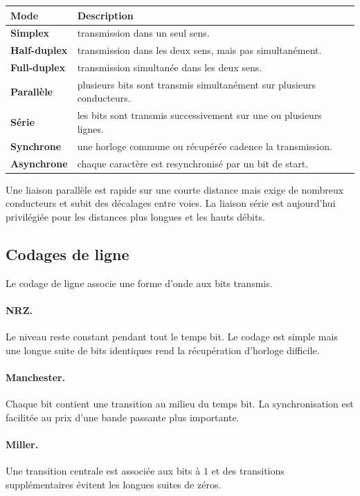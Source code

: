\begin{center}
\small
\begin{tabularx}{\linewidth}{>{\bfseries}p{2.5cm}X}
\toprule
Mode & Description \\
\midrule
Simplex & transmission dans un seul sens.\\
Half-duplex & transmission dans les deux sens, mais pas simultanément.\\
Full-duplex & transmission simultanée dans les deux sens.\\
Parallèle & plusieurs bits sont transmis simultanément sur plusieurs conducteurs.\\
Série & les bits sont transmis successivement sur une ou plusieurs lignes.\\
Synchrone & une horloge commune ou récupérée cadence la transmission.\\
Asynchrone & chaque caractère est resynchronisé par un bit de start.\\
\bottomrule
\end{tabularx}
\end{center}

Une liaison parallèle est rapide sur une courte distance mais exige de nombreux conducteurs et subit des décalages entre voies. La liaison série est aujourd'hui privilégiée pour les distances plus longues et les hauts débits.

\subsection{Codages de ligne}

Le codage de ligne associe une forme d'onde aux bits transmis.

\paragraph{NRZ.}
Le niveau reste constant pendant tout le temps bit. Le codage est simple mais une longue suite de bits identiques rend la récupération d'horloge difficile.

\paragraph{Manchester.}
Chaque bit contient une transition au milieu du temps bit. La synchronisation est facilitée au prix d'une bande passante plus importante.

\paragraph{Miller.}
Une transition centrale est associée aux bits à $1$ et des transitions supplémentaires évitent les longues suites de zéros.

